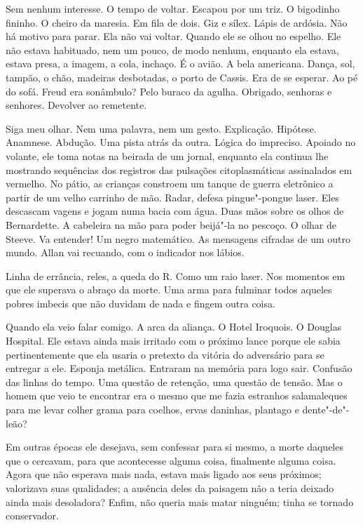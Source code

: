 Sem nenhum interesse. O tempo de voltar. Escapou por um triz. O
bigodinho fininho. O cheiro da maresia. Em fila de dois. Giz e sílex.
Lápis de ardósia. Não há motivo para parar. Ela não vai voltar. Quando
ele se olhou no espelho. Ele não estava habituado, nem um pouco, de modo
nenhum, enquanto ela estava, estava presa, a imagem, a cola, inchaço. É
o avião. A bela americana. Dança, sol, tampão, o chão, madeiras
desbotadas, o porto de Cassis. Era de se esperar. Ao pé do sofá. Freud
era sonâmbulo? Pelo buraco da agulha. Obrigado, senhoras e senhores.
Devolver ao remetente.

Siga meu olhar. Nem uma palavra, nem um gesto. Explicação. Hipótese.
Anamnese. Abdução. Uma pista atrás da outra. Lógica do impreciso.
Apoiado no volante, ele toma notas na beirada de um jornal, enquanto ela
continua lhe mostrando sequências dos registros das pulsações
citoplasmáticas assinalados em vermelho. No pátio, as crianças constroem
um tanque de guerra eletrônico a partir de um velho carrinho de mão.
Radar, defesa pingue"-pongue laser. Eles descascam vagens e jogam numa
bacia com água. Duas mãos sobre os olhos de Bernardette. A cabeleira na
mão para poder beijá"-la no pescoço. O olhar de Steeve. Va entender! Um
negro matemático. As mensagens cifradas de um outro mundo. Allan vai
recuando, com o indicador nos lábios.

Linha de errância, reles, a queda do R. Como um raio laser. Nos momentos
em que ele superava o abraço da morte. Uma arma para fulminar todos
aqueles pobres imbecis que não duvidam de nada e fingem outra coisa.

Quando ela veio falar comigo. A arca da aliança. O Hotel Iroquois. O
Douglas Hospital. Ele estava ainda mais irritado com o próximo lance
porque ele sabia pertinentemente que ela usaria o pretexto da vitória do
adversário para se entregar a ele. Esponja metálica. Entraram na memória
para logo sair. Confusão das linhas do tempo. Uma questão de retenção,
uma questão de tensão. Mas o homem que veio te encontrar era o mesmo que
me fazia estranhos salamaleques para me levar colher grama para coelhos,
ervas daninhas, plantago e dente"-de"-leão?

Em outras épocas ele desejava, sem confessar para si mesmo, a morte
daqueles que o cercavam, para que acontecesse alguma coisa, finalmente
alguma coisa. Agora que não esperava mais nada, estava mais ligado aos
seus próximos; valorizava suas qualidades; a ausência deles da paisagem
não a teria deixado ainda mais desoladora? Enfim, não queria mais matar
ninguém; tinha se tornado conservador.

